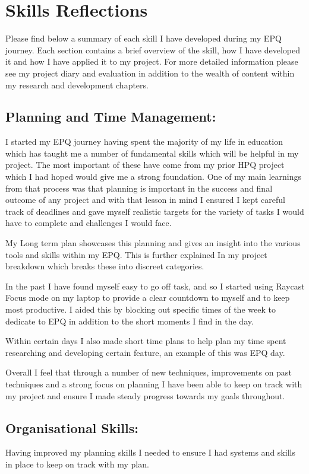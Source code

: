 \section{Skills Reflections}
Please find below a summary of each skill I have developed during my EPQ journey. Each section contains a brief overview of the skill, how I have developed it and how I have applied it to my project. For more detailed information please see my project diary and evaluation in addition to the wealth of content within my research and development chapters.


\subsection{Planning and Time Management:}
I started my EPQ journey having spent the majority of my life in education which has taught me a number of fundamental skills which will be helpful in my project. The most important of these have come from my prior HPQ project which I had hoped would give me a strong foundation. One of my main learnings from that process was that planning is important in the success and final outcome of any project and with that lesson in mind I ensured I kept careful track of deadlines and gave myself realistic targets for the variety of tasks I would have to complete and challenges I would face. 

My Long term plan showcases this planning and gives an insight into the various tools and skills within my EPQ. This is further explained In my project breakdown which breaks these into discreet categories.

In the past I have found myself easy to go off task, and so I started using Raycast Focus mode on my laptop to provide a clear countdown to myself and to keep most productive. I aided this by blocking out specific times of the week to dedicate to EPQ in addition to the short moments I find in the day. 

Within certain days I also made short time plans to help plan my time spent researching and developing certain feature, an example of this was EPQ day.

Overall I feel that through a number of new techniques, improvements on past techniques and a strong focus on planning I have been able to keep on track with my project and ensure I made steady progress towards my goals throughout.


\subsection{Organisational Skills:}
Having improved my planning skills I needed to ensure I had systems and skills in place to keep on track with my plan.

